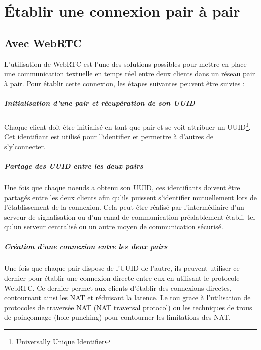 \chapter{Établir une connexion pair à pair}

\section{Avec WebRTC}

L'utilisation de WebRTC est l'une des solutions possibles pour mettre en place une communication textuelle en temps réel entre deux clients dans un réseau pair à pair.
Pour établir cette connexion, les étapes suivantes peuvent être suivies :

\paragraph{Initialisation d'une pair et récupération de son UUID}

Chaque client doit être initialisé en tant que pair et se voit attribuer un UUID\footnote{Universally Unique Identifier}. Cet identifiant est utilisé pour l'identifier et permettre à d'autres de s'y'connecter.

\paragraph{Partage des UUID entre les deux pairs}

Une fois que chaque noeuds a obtenu son UUID, ces identifiants doivent être partagés entre les deux clients afin qu'ils puissent s'identifier mutuellement lors de l'établissement de la connexion. 
Cela peut être réalisé par l'intermédiaire d'un serveur de signalisation ou d'un canal de communication préalablement établi, tel qu'un serveur centralisé ou un autre moyen de communication sécurisé.

\paragraph{Création d'une connexion entre les deux pairs}

Une fois que chaque pair dispose de l'UUID de l'autre, ils peuvent utiliser ce dernier pour établir une connexion directe entre eux en utilisant le protocole WebRTC. Ce dernier permet aux clients d'établir des connexions directes,
contournant ainsi les NAT et réduisant la latence. Le tou grace à l'utilisation de protocoles de traversée NAT (NAT traversal protocol) ou les techniques de trous de poinçonnage (hole punching) pour contourner les limitations des NAT.

